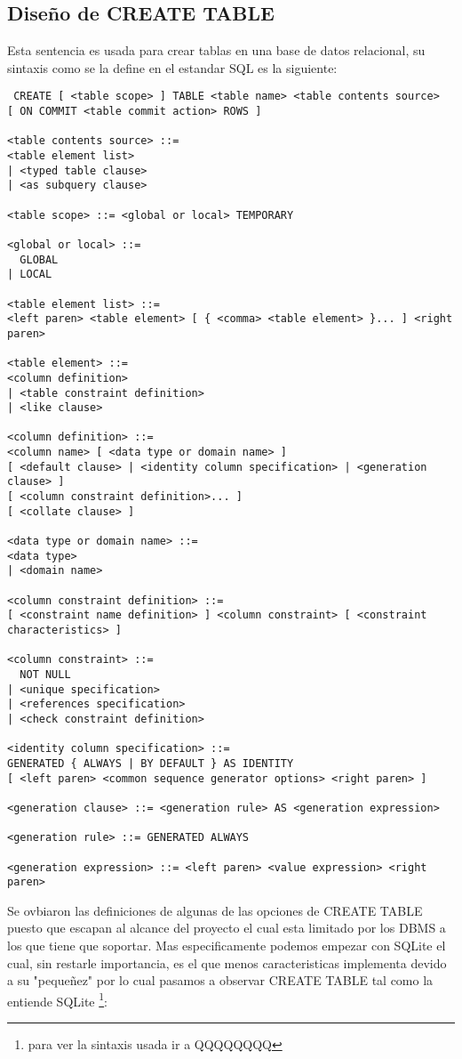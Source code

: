 \subsection{Diseño de CREATE TABLE}
Esta sentencia es usada para crear tablas en una base de datos relacional, su sintaxis como se la define en el estandar SQL es la siguiente:
\begin{verbatim}
 CREATE [ <table scope> ] TABLE <table name> <table contents source>
[ ON COMMIT <table commit action> ROWS ]

<table contents source> ::=
<table element list>
| <typed table clause>
| <as subquery clause>

<table scope> ::= <global or local> TEMPORARY

<global or local> ::=
  GLOBAL
| LOCAL

<table element list> ::=
<left paren> <table element> [ { <comma> <table element> }... ] <right paren>

<table element> ::=
<column definition>
| <table constraint definition>
| <like clause>

<column definition> ::=
<column name> [ <data type or domain name> ]
[ <default clause> | <identity column specification> | <generation clause> ]
[ <column constraint definition>... ]
[ <collate clause> ]

<data type or domain name> ::=
<data type>
| <domain name>

<column constraint definition> ::=
[ <constraint name definition> ] <column constraint> [ <constraint characteristics> ]

<column constraint> ::=
  NOT NULL
| <unique specification>
| <references specification>
| <check constraint definition>

<identity column specification> ::=
GENERATED { ALWAYS | BY DEFAULT } AS IDENTITY
[ <left paren> <common sequence generator options> <right paren> ]

<generation clause> ::= <generation rule> AS <generation expression>

<generation rule> ::= GENERATED ALWAYS

<generation expression> ::= <left paren> <value expression> <right paren>

\end{verbatim}
Se ovbiaron las definiciones de algunas de las opciones de CREATE TABLE puesto que escapan al alcance del proyecto el cual esta limitado por los DBMS a los que tiene que soportar. Mas especificamente podemos empezar con SQLite el cual, sin restarle importancia, es el que menos caracteristicas implementa devido a su "pequeñez" por lo cual pasamos a observar CREATE TABLE tal como la entiende SQLite \footnote{para ver la sintaxis usada ir a QQQQQQQQ}:
